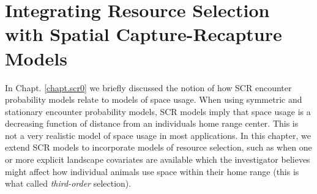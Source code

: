 \chapter{
Integrating Resource Selection
with
Spatial Capture-Recapture
Models}

\label{chapt.rsf}

\vspace{.3in}

In Chapt. \ref{chapt.scr0} we briefly discussed the notion of how
SCR encounter probability models relate to models of space usage.
When using symmetric and stationary encounter probability models, SCR
models imply that space usage is a decreasing function of distance
from an individuals home range center. This is not a very realistic
model of space usage in most applications.  In this chapter, we extend SCR
models to incorporate models of resource selection,
such as when
one or more explicit landscape covariates are available which the
investigator believes might affect how individual animals use space
within their home range (this is what \citet{johnson:1980} called {\it
  third-order} selection).  

